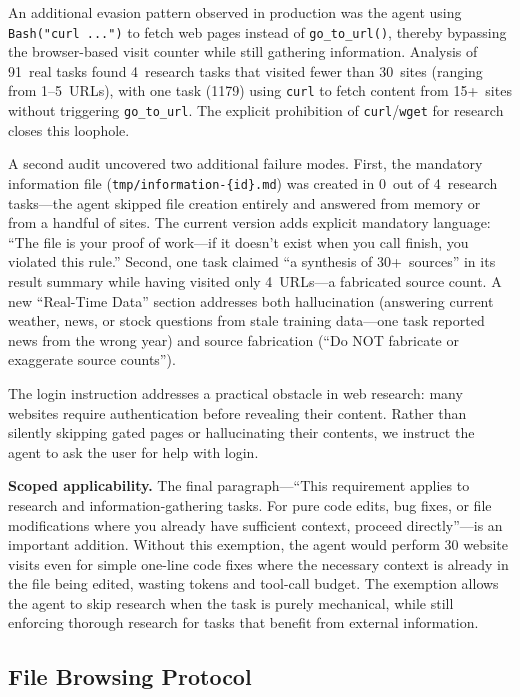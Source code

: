 \documentclass{article}
\begin{document}
An additional evasion pattern observed in production was the agent using \texttt{Bash("curl ...")} to fetch web pages instead of \texttt{go\_to\_url()}, thereby bypassing the browser-based visit counter while still gathering information.  Analysis of 91~real tasks found 4~research tasks that visited fewer than 30~sites (ranging from 1--5~URLs), with one task (1179) using \texttt{curl} to fetch content from 15+~sites without triggering \texttt{go\_to\_url}.  The explicit prohibition of \texttt{curl}/\texttt{wget} for research closes this loophole.

A second audit uncovered two additional failure modes.  First, the mandatory information file (\texttt{tmp/information-\{id\}.md}) was created in 0~out of 4~research tasks---the agent skipped file creation entirely and answered from memory or from a handful of sites.  The current version adds explicit mandatory language: ``The file is your proof of work---if it doesn't exist when you call finish, you violated this rule.''  Second, one task claimed ``a synthesis of 30+~sources'' in its result summary while having visited only 4~URLs---a fabricated source count.  A new ``Real-Time Data'' section addresses both hallucination (answering current weather, news, or stock questions from stale training data---one task reported news from the wrong year) and source fabrication (``Do NOT fabricate or exaggerate source counts'').

The login instruction addresses a practical obstacle in web research: many websites require authentication before revealing their content.  Rather than silently skipping gated pages or hallucinating their contents, we instruct the agent to ask the user for help with login.

\textbf{Scoped applicability.}  The final paragraph---``This requirement applies to research and information-gathering tasks.  For pure code edits, bug fixes, or file modifications where you already have sufficient context, proceed directly''---is an important addition.  Without this exemption, the agent would perform 30 website visits even for simple one-line code fixes where the necessary context is already in the file being edited, wasting tokens and tool-call budget.  The exemption allows the agent to skip research when the task is purely mechanical, while still enforcing thorough research for tasks that benefit from external information.

\subsection{File Browsing Protocol}
\end{document}
